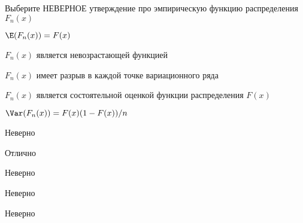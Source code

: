 
\begin{question}
Выберите НЕВЕРНОЕ утверждение про эмпирическую функцию распределения
\(F_n(x)\)
\begin{answerlist}
  \item \(\E(F_n(x))=F(x)\)
  \item \(F_n(x)\) является невозрастающей функцией
  \item \(F_n(x)\) имеет разрыв в каждой точке вариационного ряда
  \item \(F_n(x)\) является состоятельной оценкой функции распределения \(F(x)\)
  \item \(\Var(F_n(x))=F(x)(1-F(x))/n\)
\end{answerlist}
\end{question}

\begin{solution}
\begin{answerlist}
  \item Неверно
  \item Отлично
  \item Неверно
  \item Неверно
  \item Неверно
\end{answerlist}
\end{solution}

